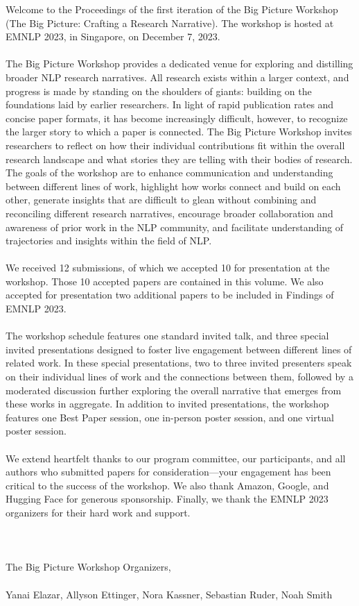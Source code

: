 Welcome to the Proceedings of the first iteration of the Big Picture Workshop (The Big Picture: Crafting a Research Narrative). The workshop is hosted at EMNLP 2023, in Singapore, on December 7, 2023. 
\\\\
The Big Picture Workshop provides a dedicated venue for exploring and distilling broader NLP research narratives. All research exists within a larger context, and progress is made by standing on the shoulders of giants: building on the foundations laid by earlier researchers. In light of rapid publication rates and concise paper formats, it has become increasingly difficult, however, to recognize the larger story to which a paper is connected. The Big Picture Workshop invites researchers to reflect on how their individual contributions fit within the overall research landscape and what stories they are telling with their bodies of research. The goals of the workshop are to enhance communication and understanding between different lines of work, highlight how works connect and build on each other, generate insights that are difficult to glean without combining and reconciling different research narratives, encourage broader collaboration and awareness of prior work in the NLP community, and facilitate understanding of trajectories and insights within the field of NLP.
\\\\
We received 12 submissions, of which we accepted 10 for presentation at the workshop. Those 10 accepted papers are contained in this volume. We also accepted for presentation two additional papers to be included in Findings of EMNLP 2023.
\\\\
The workshop schedule features one standard invited talk, and three special invited presentations designed to foster live engagement between different lines of related work. In these special presentations, two to three invited presenters speak on their individual lines of work and the connections between them, followed by a moderated discussion further exploring the overall narrative that emerges from these works in aggregate. In addition to invited presentations, the workshop features one Best Paper session, one in-person poster session, and one virtual poster session.
\\\\
We extend heartfelt thanks to our program committee, our participants, and all authors who submitted papers for consideration---your engagement has been critical to the success of the workshop. We also thank Amazon, Google, and Hugging Face for generous sponsorship. Finally, we thank the EMNLP 2023 organizers for their hard work and support. 
\\\\\\\\
The Big Picture Workshop Organizers,
\\\\
Yanai Elazar, Allyson Ettinger, Nora Kassner, Sebastian Ruder, Noah Smith

